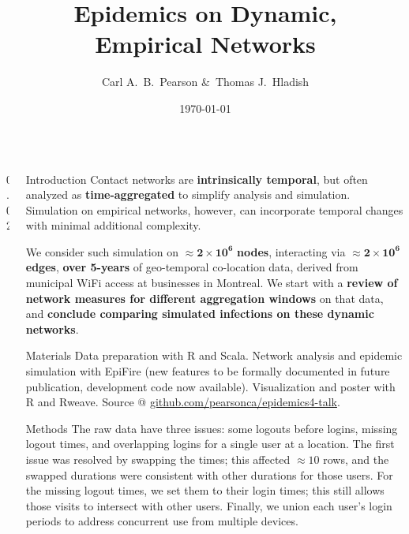 \documentclass[final]{beamer} %
\title[Epi. on Emp. Nets]{Epidemics on Dynamic,\\ Empirical Networks}
\author[Pearson \& Hladish]{Carl A.~B.~Pearson \&\ Thomas J.~Hladish}
\institute[EPI-UF]{Emerging Pathogens Institute, University of Florida}
\date{\today}
\newcommand{\spaceProp}{0.02}
\newcommand{\spacer}{\begin{column}{\spaceProp\paperwidth}\end{column}}
\newenvironment{oneCol}{\begin{column}[t]{0.225\paperwidth}}{\end{column}}
\begin{document}

  \begin{frame}{}
    \begin{columns}[t]
    \spacer{}
    \begin{oneCol}
    \begin{block}{Introduction}
Contact networks are \textbf{intrinsically temporal}, but often analyzed as \textbf{time-aggregated} to simplify analysis and simulation.  Simulation on empirical networks, however, can incorporate temporal changes with minimal additional complexity.

We consider such simulation on $\mathbf{\approx 2\times 10^6}$\textbf{ nodes}, interacting via $\mathbf{\approx 2\times 10^6}$\textbf{ edges}, \textbf{over 5-years} of geo-temporal co-location data, derived from municipal WiFi access at businesses in Montreal\cite{hoen2013montreal}.  We start with a \textbf{review of network measures for different aggregation windows} on that data, and \textbf{conclude comparing simulated infections on these dynamic networks}.
    \end{block}
    \begin{block}{Materials}
Data preparation with R and Scala.  Network analysis and epidemic simulation with EpiFire\cite{hladish2012epifire} (new features to be formally documented in future publication, development code now available).  Visualization and poster with R and Rweave.  Source @ \href{https://github.com/pearsonca/epidemics4-talk}{github.com/pearsonca/epidemics4-talk}.
    \end{block}
    \begin{block}{Methods}
The raw data have three issues: some logouts before logins, missing logout times, and overlapping logins for a single user at a location.  The first issue was resolved by swapping the times; this affected $\approx 10$ rows, and the swapped durations were consistent with other durations for those users.  For the missing logout times, we set them to their login times; this still allows those visits to intersect with other users.  Finally, we union each user's login periods to address concurrent use from multiple devices.


\end{block}
\end{oneCol}
\end{columns}
\end{frame}
\end{document}
